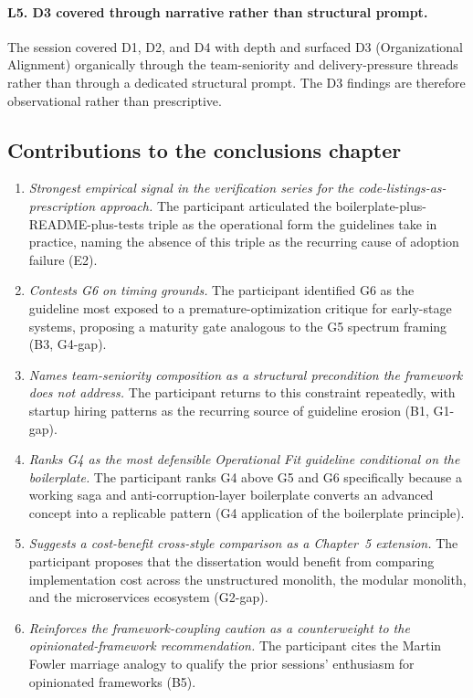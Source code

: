 \paragraph*{L5. D3 covered through narrative rather than structural prompt.} The session covered D1, D2, and D4 with depth and surfaced D3 (Organizational Alignment) organically through the team-seniority and delivery-pressure threads rather than through a dedicated structural prompt. The D3 findings are therefore observational rather than prescriptive.

\subsection*{Contributions to the conclusions chapter}

\begin{enumerate}[itemsep=4pt,topsep=2pt]
  \item \emph{Strongest empirical signal in the verification series for the code-listings-as-prescription approach.} The participant articulated the boilerplate-plus-README-plus-tests triple as the operational form the guidelines take in practice, naming the absence of this triple as the recurring cause of adoption failure (E2).
  \item \emph{Contests G6 on timing grounds.} The participant identified G6 as the guideline most exposed to a premature-optimization critique for early-stage systems, proposing a maturity gate analogous to the G5 spectrum framing (B3, G4-gap).
  \item \emph{Names team-seniority composition as a structural precondition the framework does not address.} The participant returns to this constraint repeatedly, with startup hiring patterns as the recurring source of guideline erosion (B1, G1-gap).
  \item \emph{Ranks G4 as the most defensible Operational Fit guideline conditional on the boilerplate.} The participant ranks G4 above G5 and G6 specifically because a working saga and anti-corruption-layer boilerplate converts an advanced concept into a replicable pattern (G4 application of the boilerplate principle).
  \item \emph{Suggests a cost-benefit cross-style comparison as a Chapter~5 extension.} The participant proposes that the dissertation would benefit from comparing implementation cost across the unstructured monolith, the modular monolith, and the microservices ecosystem (G2-gap).
  \item \emph{Reinforces the framework-coupling caution as a counterweight to the opinionated-framework recommendation.} The participant cites the Martin Fowler marriage analogy to qualify the prior sessions' enthusiasm for opinionated frameworks (B5).
\end{enumerate}

